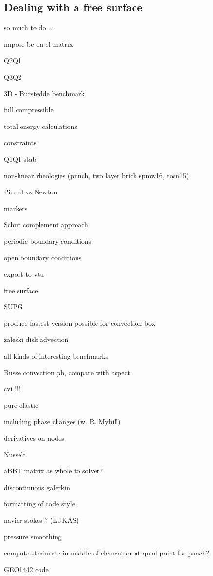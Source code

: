 \documentclass[a4paper]{article}
\begin{document}
\subsection{Dealing with a free surface}









\newpage
so much to do ... 

impose bc on el matrix

Q2Q1 

Q3Q2

3D - Burstedde benchmark 

full compressible 

total energy calculations

constraints

Q1Q1-stab

non-linear rheologies (punch, two layer brick spmw16, tosn15) 

Picard vs Newton

markers

Schur complement approach

periodic boundary conditions

open boundary conditions

export to vtu 

free surface 

SUPG

produce fastest version possible for convection box

zaleski disk advection

all kinds of interesting benchmarks

Busse convection pb, compare with aspect 

cvi !!!

pure elastic 

including phase changes (w. R. Myhill)

derivatives on nodes

Nusselt

aBBT matrix as whole to solver?

discontinuous galerkin

formatting of code style

navier-stokes ? (LUKAS)

pressure smoothing

compute strainrate in middle of element or at quad point for punch?

GEO1442 code 
\end{document}
